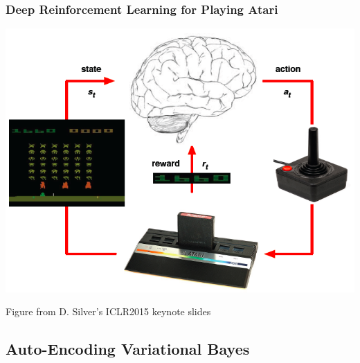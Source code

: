 \begin{frame}
\frametitle{Deep Reinforcement Learning for Playing Atari \cite{mnih13atari}}
\centerline{\includegraphics[scale=0.4]{figs/dqn_atari}}
\small{Figure from D. Silver's ICLR2015 keynote slides}
\end{frame}


\subsection[Variational Auto-Encoder]{Auto-Encoding Variational Bayes}


